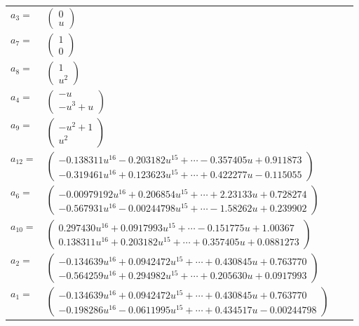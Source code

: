 \documentclass[1p]{elsarticle_modified}
\theoremstyle{definition}
\begin{document}
\begin{tabular}{m{7pt} m{180pt} m{7pt} m{180pt} }
\flushright $a_{3}=$&$\begin{pmatrix}0\\u\end{pmatrix}$ \\
\flushright $a_{7}=$&$\begin{pmatrix}1\\0\end{pmatrix}$ \\
\flushright $a_{8}=$&$\begin{pmatrix}1\\u^2\end{pmatrix}$ \\
\flushright $a_{4}=$&$\begin{pmatrix}- u\\- u^3+u\end{pmatrix}$ \\
\flushright $a_{9}=$&$\begin{pmatrix}- u^2+1\\u^2\end{pmatrix}$ \\
\flushright $a_{12}=$&$\begin{pmatrix}-0.138311 u^{16}-0.203182 u^{15}+\cdots-0.357405 u+0.911873\\-0.319461 u^{16}+0.123623 u^{15}+\cdots+0.422277 u-0.115055\end{pmatrix}$ \\
\flushright $a_{6}=$&$\begin{pmatrix}-0.00979192 u^{16}+0.206854 u^{15}+\cdots+2.23133 u+0.728274\\-0.567931 u^{16}-0.00244798 u^{15}+\cdots-1.58262 u+0.239902\end{pmatrix}$ \\
\flushright $a_{10}=$&$\begin{pmatrix}0.297430 u^{16}+0.0917993 u^{15}+\cdots-0.151775 u+1.00367\\0.138311 u^{16}+0.203182 u^{15}+\cdots+0.357405 u+0.0881273\end{pmatrix}$ \\
\flushright $a_{2}=$&$\begin{pmatrix}-0.134639 u^{16}+0.0942472 u^{15}+\cdots+0.430845 u+0.763770\\-0.564259 u^{16}+0.294982 u^{15}+\cdots+0.205630 u+0.0917993\end{pmatrix}$ \\
\flushright $a_{1}=$&$\begin{pmatrix}-0.134639 u^{16}+0.0942472 u^{15}+\cdots+0.430845 u+0.763770\\-0.198286 u^{16}-0.0611995 u^{15}+\cdots+0.434517 u-0.00244798\end{pmatrix}$ \\

\end{tabular}
\end{document}
